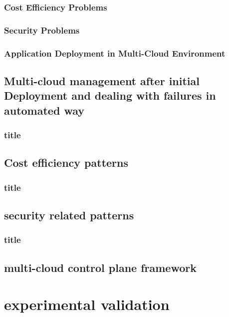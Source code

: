 \documentclass[12pt]{article}
\begin{document}
	\subsubsection{Cost Efficiency Problems}
	
	\subsubsection{Security Problems}
	
	\subsubsection{Application Deployment in Multi-Cloud Environment}
	
	\subsection{Multi-cloud management after initial Deployment and dealing with failures in automated way}
	
	\subsubsection{title}
	
	\subsection{Cost efficiency patterns}

	\subsubsection{title}

	\subsection{security related patterns}

    \subsubsection{title}
	
	\subsection{multi-cloud control plane framework}
	
	\section{experimental validation}
	
\end{document}
